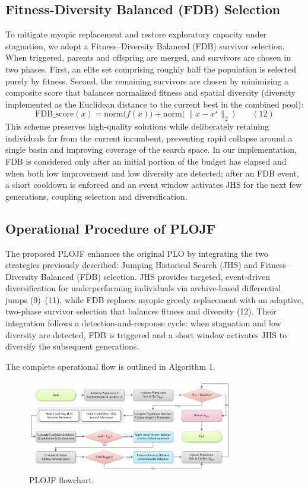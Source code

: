 \documentclass[3p]{elsarticle}
\begin{document}
\subsection{Fitness-Diversity Balanced (FDB) Selection}
To mitigate myopic replacement and restore exploratory capacity under stagnation, we adopt a Fitness–Diversity Balanced (FDB) survivor selection. When triggered, parents and offspring are merged, and survivors are chosen in two phases. First, an elite set comprising roughly half the population is selected purely by fitness. Second, the remaining survivors are chosen by minimizing a composite score that balances normalized fitness and spatial diversity (diversity implemented as the Euclidean distance to the current best in the combined pool):
\[ \mathrm{FDB\_score}(x) = \mathrm{norm}\bigl(f(x)\bigr) + \mathrm{norm}\bigl(\,\|x - x^{\star}\|_2\,\bigr) \qquad(12) \]
This scheme preserves high-quality solutions while deliberately retaining individuals far from the current incumbent, preventing rapid collapse around a single basin and improving coverage of the search space. In our implementation, FDB is considered only after an initial portion of the budget has elapsed and when both low improvement and low diversity are detected; after an FDB event, a short cooldown is enforced and an event window activates JHS for the next few generations, coupling selection and diversification.

\subsection{Operational Procedure of PLOJF}
The proposed PLOJF enhances the original PLO by integrating the two strategies previously described: Jumping Historical Search (JHS) and Fitness–Diversity Balanced (FDB) selection. JHS provides targeted, event-driven diversification for underperforming individuals via archive-based differential jumps (9)–(11), while FDB replaces myopic greedy replacement with an adaptive, two-phase survivor selection that balances fitness and diversity (12). Their integration follows a detection-and-response cycle: when stagnation and low diversity are detected, FDB is triggered and a short window activates JHS to diversify the subsequent generations.

The complete operational flow is outlined in Algorithm 1.

\begin{figure}[h]
\centering
\includegraphics[width=0.8\textwidth]{PLOJF-flowchart}
\caption{PLOJF flowchart.}
\label{fig:flowchart}
\end{figure}
\end{document}
